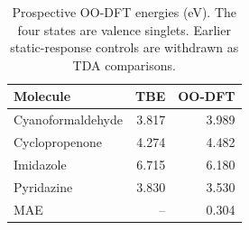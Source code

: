 \begin{table}[!htbp]
\centering\small
\caption{Prospective OO-DFT energies (eV). The four states are valence singlets. Earlier static-response controls are withdrawn as TDA comparisons.}\label{tab:prospective}
\begin{tabular}{lrr}
\toprule
Molecule & TBE & OO-DFT \\
\midrule
Cyanoformaldehyde & 3.817 & 3.989 \\
Cyclopropenone & 4.274 & 4.482 \\
Imidazole & 6.715 & 6.180 \\
Pyridazine & 3.830 & 3.530 \\
MAE & -- & 0.304 \\
\bottomrule
\end{tabular}
\end{table}
